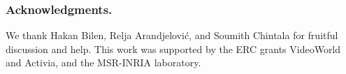 \documentclass[runningheads]{llncs}
\begin{document}
 


\subsubsection{Acknowledgments.}
We thank Hakan Bilen, Relja Arandjelovi\'{c}, and Soumith Chintala for fruitful discussion and help.
This work was supported by the ERC grants VideoWorld and Activia, and the MSR-INRIA laboratory.

 
\clearpage



\end{document}
